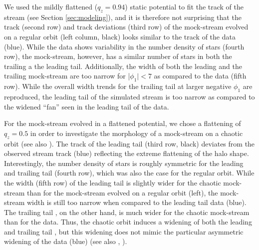 \documentclass[twocolumn]{aastex62}
\newcommand{\sa}[1]{{\color{magenta} SP: #1}}
\begin{document}
\begin{figure}
{%
}
\label{fig:sims}
\end{figure}


We used the mildly flattened ($q_z = 0.94$) static potential to fit the track of the stream (see Section \ref{sec:modeling}), and it is therefore not surprising that the track (second row) and track deviations (third row) of the mock-stream evolved on a regular orbit (left column, black) looks similar to the track of the data (blue).  While the data shows variability in the number density of stars (fourth row), the mock-stream, however, has a similar number of stars in both the trailing a the leading tail. Additionally, the width of both the leading and the trailing mock-stream are too narrow for |$\phi_1| < 7$ as compared to the data (fifth row). While the overall width trends for the trailing tail  at larger negative $\phi_1$ are reproduced, the leading tail of the simulated stream is too narrow as compared to the widened ``fan'' seen in the leading tail of the data.

For the mock-stream evolved in a flattened potential,
we chose a flattening of $q_z = 0.5$  in order to investigate the morphology of a mock-stream on a chaotic orbit (see also \citealt{Fardal:2015}). The track of the leading tail (third row, black) deviates from the observed stream track (blue) reflecting the extreme flattening of the halo shape. Interestingly, the number density of stars is roughly symmetric for the leading and trailing tail  (fourth row), which was also the case for the regular orbit. While the width (fifth row) of the leading tail is slightly wider for the chaotic mock-stream than for the mock-stream evolved on a regular orbit (left), the mock-stream width is still too narrow when compared to the leading tail data (blue). The trailing tail , on the other hand, is much wider for the chaotic mock-stream than for the data. Thus, the chaotic orbit induces a widening of both the leading and trailing tail , but this widening does not mimic the particular asymmetric widening of the data (blue) (see also \citealt{Pearson:2015}, \citealt{Price-Whelan:2016}).
\end{document}
